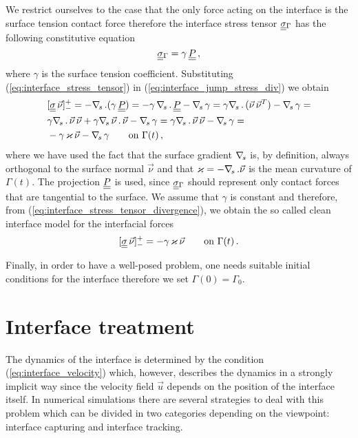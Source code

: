 We restrict ourselves to the case that the only force acting on the interface
is the surface tension contact force therefore the interface stress tensor
$\mat\sigma_\Gamma$ has the following constitutive equation
\begin{equation}\label{eq:interface_stress_tensor}
\mat\sigma_{\Gamma}=\gamma\,\mat P\,,
\end{equation}
where $\gamma$ is the surface tension coefficient. Substituting
(\ref{eq:interface_stress_tensor}) in (\ref{eq:interface_jump_stress_div}) we
obtain
\begin{equation}\label{eq:interface_stress_tensor_divergence}
\begin{split}
& [\mat\sigma\,\vec \nu]_-^+ = -\nabs\,.(\gamma\,\mat P)=-\gamma\,\nabs\,.\,\mat
P-\nabs\,\gamma = \gamma\nabs\,.\,(\vec\nu\,\vec\nu^T)-\nabs\,\gamma = \\
& \gamma\nabs\,.\,\vec\nu\,\vec\nu +\gamma\nabs\,\vec\nu\,.\,\vec\nu -
\nabs\,\gamma = \gamma\nabs\,.\,\vec\nu\,\vec\nu - \nabs\,\gamma = \\
& -\gamma\,\varkappa\,\vec\nu - \nabs\,\gamma \qquad \mbox{on } \Gamma(t)\,,
\end{split}
\end{equation}
where we have used the fact that the surface gradient $\nabla_{\!s}$ is, by definition,
always orthogonal to the surface normal $\vec\nu$ and that $\varkappa =
-\nabla_{\!s}\,.\vec\nu$ is the mean curvature of $\Gamma(t)$. The projection $\mat P$
is used, since $\mat\sigma_{\Gamma}$ should represent only contact forces that
are tangential to the surface. We assume that $\gamma$ is constant and
therefore, from (\ref{eq:interface_stress_tensor_divergence}), we obtain the
so called clean interface model for the interfacial forces
\begin{equation}\label{eq:interface_jump_stress}
[\mat\sigma\,\vec \nu]_-^+ = -\gamma\,\varkappa\,\vec\nu \qquad \mbox{on }
\Gamma(t)\,.
\end{equation}

Finally, in order to have a well-posed problem, one needs suitable initial
conditions for the interface therefore we set $\Gamma(0)=\Gamma_0$.

\section[Interface treatment]{Interface treatment}
The dynamics of the interface is determined by the condition
(\ref{eq:interface_velocity}) which, however, describes the dynamics in a
strongly implicit way since the velocity field $\vec u$ depends on the
position of the interface itself. In numerical simulations there are
several strategies to deal with this problem which can be divided in two
categories depending on the viewpoint: interface capturing and interface
tracking.

